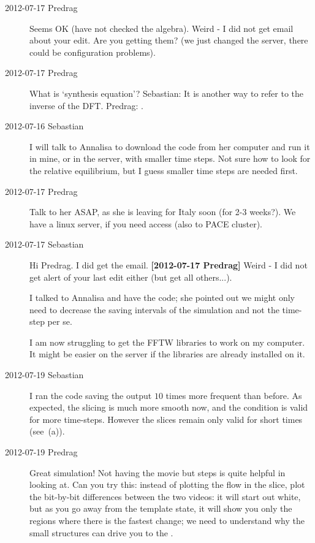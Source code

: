 \begin{description}
\item[2012-07-17 Predrag]
Seems OK (have not checked the algebra). Weird - I did not get email
about your edit. Are you getting them? (we just changed the server, there
could be configuration problems).

\item[2012-07-17 Predrag]
What is `synthesis equation'? Sebastian: It is another way to refer to the inverse of the DFT.
Predrag:
.


\item[2012-07-16 Sebastian]
I will talk to Annalisa to download the code from her computer and run it
in mine, or in the server, with smaller time steps. Not sure how to look
for the relative equilibrium, but I guess smaller time steps are needed
first.

\item[2012-07-17 Predrag]
Talk to her ASAP, as she is leaving for Italy soon (for 2-3 weeks?).
We have a linux server, if you need access (also to PACE cluster).

\item[2012-07-17 Sebastian]
Hi Predrag. I did get the email. {\bf [2012-07-17 Predrag]} Weird - I did
not get alert of your last edit either (but get all others...).

I talked to Annalisa and have the code; she pointed out we might only
need to decrease the saving intervals of the simulation and not the
time-step per se.

I am now struggling to get the FFTW libraries to work on my computer. It
might be easier on the server if the libraries are already installed on
it.

\item[2012-07-19 Sebastian]
I ran the code saving the output $10$ times more frequent than before. As
expected, the slicing is much more smooth now, and the {\chartBord}
condition is valid for more time-steps. However the slices remain only
valid for short times (see \,(a)).

\item[2012-07-19 Predrag] Great simulation! Not having the movie but steps
is quite helpful in looking at. Can you try this: instead of plotting
the flow in the slice, plot the bit-by-bit differences between the two videos:
it will start out white, but as you go away from the template state, it will
show you only the regions where there is the fastest change; we need to understand why
the small structures can drive you to the \chartBord.


\end{description}
